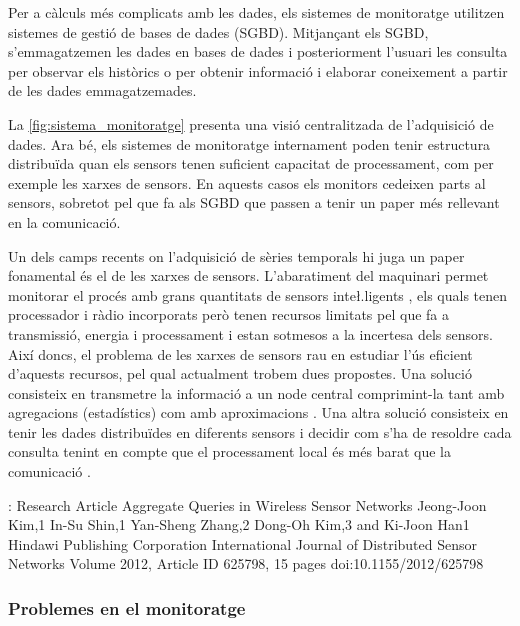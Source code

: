 Per a càlculs més complicats amb les dades, els sistemes de
monitoratge utilitzen sistemes de gestió de bases de dades
(SGBD). Mitjançant els SGBD, s'emmagatzemen les dades en bases de
dades i posteriorment l'usuari les consulta per observar els històrics
o per obtenir informació i elaborar coneixement a partir de les dades
emmagatzemades.

La \autoref{fig:sistema_monitoratge} presenta una visió centralitzada
de l'adquisició de dades. Ara bé, els sistemes de monitoratge
internament poden tenir estructura distribuïda quan els sensors tenen
suficient capacitat de processament, com per exemple les xarxes de
sensors. En aquests casos els monitors cedeixen parts al sensors,
sobretot pel que fa als SGBD que passen a tenir un paper més rellevant
en la comunicació.


Un dels camps recents on l'adquisició de sèries temporals hi juga un
paper fonamental és el de les xarxes de sensors. L'abaratiment del
maquinari permet monitorar el procés amb grans quantitats de sensors
inte\l.ligents \parencite{jainagrawal05,yaogehrke02}, els quals tenen
processador i ràdio incorporats però tenen recursos limitats pel que
fa a transmissió, energia i processament i estan sotmesos a la
incertesa dels sensors. Així doncs, el problema de les xarxes de
sensors rau en estudiar l'ús eficient d'aquests recursos, pel qual
actualment trobem dues propostes.  Una solució consisteix en
transmetre la informació a un node central comprimint-la tant amb
agregacions (estadístics) com amb
aproximacions \parencite{deligiannakis07}.  Una altra solució
consisteix en tenir les dades distribuïdes en diferents sensors i
decidir com s'ha de resoldre cada consulta tenint en compte que el
processament local és més barat que la
comunicació \parencite{yaogehrke02,gehrkemadden04,bonnet01}.


:
Research Article
Aggregate Queries in Wireless Sensor Networks
Jeong-Joon Kim,1 In-Su Shin,1 Yan-Sheng Zhang,2 Dong-Oh Kim,3 and Ki-Joon Han1
Hindawi Publishing Corporation
International Journal of Distributed Sensor Networks
Volume 2012, Article ID 625798, 15 pages
doi:10.1155/2012/625798





\subsubsection{Problemes en el monitoratge}

